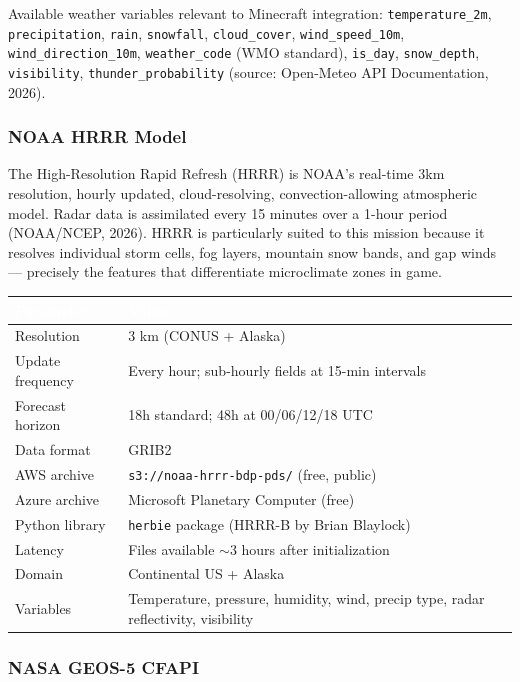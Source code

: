 \documentclass[11pt,letterpaper]{article}
\newcommand{\tableheader}[1]{\textbf{\sffamily\textcolor{white}{#1}}}
\begin{document}
Available weather variables relevant to Minecraft integration: \texttt{temperature\_2m}, \texttt{precipitation}, \texttt{rain}, \texttt{snowfall}, \texttt{cloud\_cover}, \texttt{wind\_speed\_10m}, \texttt{wind\_direction\_10m}, \texttt{weather\_code} (WMO standard), \texttt{is\_day}, \texttt{snow\_depth}, \texttt{visibility}, \texttt{thunder\_probability} (source: Open-Meteo API Documentation, 2026).

\subsubsection{NOAA HRRR Model}

The High-Resolution Rapid Refresh (HRRR) is NOAA's real-time 3km resolution, hourly updated, cloud-resolving, convection-allowing atmospheric model. Radar data is assimilated every 15 minutes over a 1-hour period (NOAA/NCEP, 2026). HRRR is particularly suited to this mission because it resolves individual storm cells, fog layers, mountain snow bands, and gap winds --- precisely the features that differentiate microclimate zones in game.

\begin{center}
\begin{tabularx}{\textwidth}{L{3.5cm}X}
\toprule
{}
\tableheader{Parameter} & \tableheader{Value} \\
\midrule
Resolution & 3 km (CONUS + Alaska) \\
Update frequency & Every hour; sub-hourly fields at 15-min intervals \\
Forecast horizon & 18h standard; 48h at 00/06/12/18 UTC \\
Data format & GRIB2 \\
AWS archive & \texttt{s3://noaa-hrrr-bdp-pds/} (free, public) \\
Azure archive & Microsoft Planetary Computer (free) \\
Python library & \texttt{herbie} package (HRRR-B by Brian Blaylock) \\
Latency & Files available $\sim$3 hours after initialization \\
Domain & Continental US + Alaska \\
Variables & Temperature, pressure, humidity, wind, precip type, radar reflectivity, visibility \\
\bottomrule
\end{tabularx}
\end{center}

\subsubsection{NASA GEOS-5 CFAPI}
\end{document}
